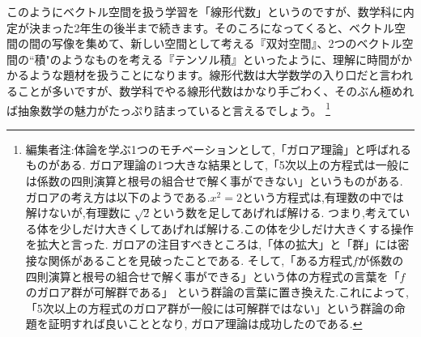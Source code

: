 このようにベクトル空間を扱う学習を「線形代数」というのですが、数学科に内定が決まった2年生の後半まで続きます。そのころになってくると、ベクトル空間の間の写像を集めて、新しい空間として考える『双対空間』、2つのベクトル空間の``積"のようなものを考える『テンソル積』といったように、理解に時間がかかるような題材を扱うことになります。線形代数は大学数学の入り口だと言われることが多いですが、数学科でやる線形代数はかなり手ごわく、そのぶん極めれば抽象数学の魅力がたっぷり詰まっていると言えるでしょう。
\footnote{編集者注:体論を学ぶ1つのモチベーションとして,「ガロア理論」と呼ばれるものがある.
ガロア理論の1つ大きな結果として,「5次以上の方程式は一般には係数の四則演算と根号の組合せで解く事ができない」というものがある.
ガロアの考え方は以下のようである.$x^2 = 2$という方程式は,有理数の中では解けないが,有理数に$\sqrt[]{2}$という数を足してあげれば解ける.
つまり,考えている体を少しだけ大きくしてあげれば解ける.この体を少しだけ大きくする操作を拡大と言った.
ガロアの注目すべきところは,「体の拡大」と「群」には密接な関係があることを見破ったことである.
そして,「ある方程式$f$が係数の四則演算と根号の組合せで解く事ができる」という体の方程式の言葉を「$f$のガロア群が可解群である」
という群論の言葉に置き換えた.これによって,「5次以上の方程式のガロア群が一般には可解群ではない」という群論の命題を証明すれば良いこととなり,
ガロア理論は成功したのである.}
